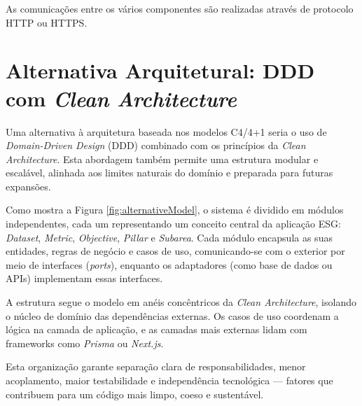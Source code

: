 As comunicações entre os vários componentes são realizadas através de protocolo HTTP ou HTTPS.

\section{Alternativa Arquitetural: DDD com \textit{Clean Architecture}}
\label{sec:SolAlt}

Uma alternativa à arquitetura baseada nos modelos C4/4+1 seria o uso de \textit{Domain-Driven Design} (DDD) combinado com os princípios da \textit{Clean Architecture}. Esta abordagem também permite uma estrutura modular e escalável, alinhada aos limites naturais do domínio e preparada para futuras expansões.

Como mostra a Figura \ref{fig:alternativeModel}, o sistema é dividido em módulos independentes, cada um representando um conceito central da aplicação ESG: \textit{Dataset}, \textit{Metric}, \textit{Objective}, \textit{Pillar} e \textit{Subarea}. Cada módulo encapsula as suas entidades, regras de negócio e casos de uso, comunicando-se com o exterior por meio de interfaces (\textit{ports}), enquanto os adaptadores (como base de dados ou APIs) implementam essas interfaces.

A estrutura segue o modelo em anéis concêntricos da \textit{Clean Architecture}, isolando o núcleo de domínio das dependências externas. Os casos de uso coordenam a lógica na camada de aplicação, e as camadas mais externas lidam com frameworks como \textit{Prisma} ou \textit{Next.js}.

Esta organização garante separação clara de responsabilidades, menor acoplamento, maior testabilidade e independência tecnológica — fatores que contribuem para um código mais limpo, coeso e sustentável.

